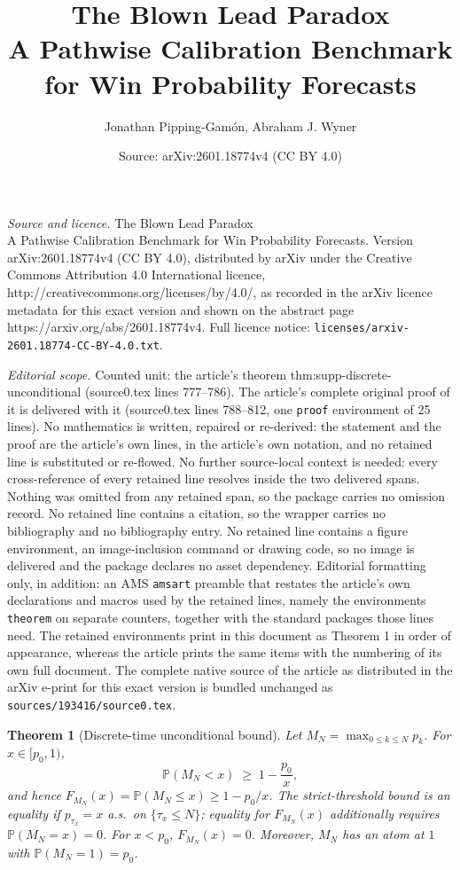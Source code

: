\documentclass[10pt,a4paper]{amsart}
\title{The Blown Lead Paradox\\[0.25em]\large A Pathwise Calibration Benchmark for Win Probability Forecasts}
\author{Jonathan Pipping-Gam\'on, Abraham J. Wyner}
\date{Source: arXiv:2601.18774v4 (CC BY 4.0)}
\newtheorem{theorem}{Theorem}
\renewcommand{\P}{\mathbb{P}}
\begin{document}
\maketitle

\noindent\emph{Source and licence.} The Blown Lead Paradox\\[0.25em]\large A Pathwise Calibration Benchmark for Win Probability Forecasts. Version arXiv:2601.18774v4 (CC BY 4.0), distributed by arXiv under the Creative Commons Attribution 4.0 International licence, http://creativecommons.org/licenses/by/4.0/, as recorded in the arXiv licence metadata for this exact version and shown on the abstract page https://arxiv.org/abs/2601.18774v4. Full licence notice: \texttt{licenses/arxiv-2601.18774-CC-BY-4.0.txt}.\par\smallskip

\noindent\textit{Editorial scope.} Counted unit: the article's theorem thm:supp-discrete-unconditional (source0.tex lines 777--786). The article's complete original proof of it is delivered with it (source0.tex lines 788--812, one \texttt{proof} environment of 25 lines). No mathematics is written, repaired or re-derived: the statement and the proof are the article's own lines, in the article's own notation, and no retained line is substituted or re-flowed.  No further source-local context is needed: every cross-reference of every retained line resolves inside the two delivered spans.  Nothing was omitted from any retained span, so the package carries no omission record.  No retained line contains a citation, so the wrapper carries no bibliography and no bibliography entry.  No retained line contains a figure environment, an image-inclusion command or drawing code, so no image is delivered and the package declares no asset dependency.  Editorial formatting only, in addition: an AMS \texttt{amsart} preamble that restates the article's own declarations and macros used by the retained lines, namely the environments \texttt{theorem} on separate counters, together with the standard packages those lines need.  The retained environments print in this document as Theorem 1 in order of appearance, whereas the article prints the same items with the numbering of its own full document.  The complete native source of the article as distributed in the arXiv e-print for this exact version is bundled unchanged as \texttt{sources/193416/source0.tex}.
\begin{theorem}[Discrete-time unconditional bound] \label{thm:supp-discrete-unconditional}
Let $M_N=\max_{0\le k\le N} p_k$. For $x\in[p_0,1)$,
\[
\P(M_N<x)\;\ge\;1-\frac{p_0}{x},
\]
and hence $F_{M_N}(x)=\P(M_N\le x)\ge 1-p_0/x$.
The strict-threshold bound is an equality if $p_{\tau_x}=x$ a.s.\ on $\{\tau_x\le N\}$; equality for $F_{M_N}(x)$ additionally requires $\P(M_N=x)=0$.
For $x<p_0$, $F_{M_N}(x)=0$.
Moreover, $M_N$ has an atom at $1$ with $\P(M_N=1)=p_0$.
\end{theorem}
\end{document}
